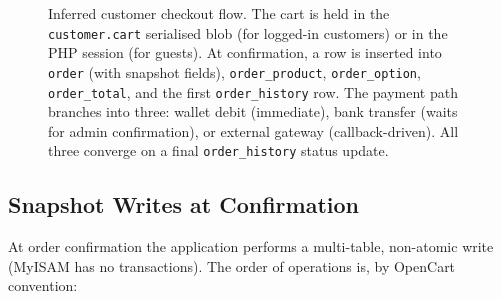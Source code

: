\documentclass[11pt,a4paper]{article}
\begin{document}
\begin{figure}[htbp]
{%
}
\caption{Inferred customer checkout flow. The cart is held in the
\texttt{customer.cart} serialised blob (for logged-in customers)
or in the PHP session (for guests). At confirmation, a row is
inserted into \texttt{order} (with snapshot fields),
\texttt{order\_product}, \texttt{order\_option},
\texttt{order\_total}, and the first \texttt{order\_history} row.
The payment path branches into three: wallet debit (immediate),
bank transfer (waits for admin confirmation), or external gateway
(callback-driven). All three converge on a final
\texttt{order\_history} status update.}
\label{fig:checkout}
\end{figure}

\subsection{Snapshot Writes at Confirmation}

At order confirmation the application performs a multi-table,
non-atomic write (MyISAM has no transactions). The order of
operations is, by OpenCart convention:
\end{document}
